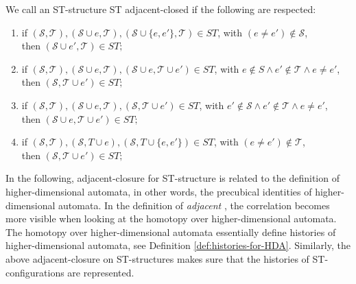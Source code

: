     \begin{definition}
        \label{def:ST adjacent-closure}
        We call an ST-structure ST adjacent-closed if the following are respected:
       
       \begin{enumerate}
           \item if $(\mathcal{S},\mathcal{T}), (\mathcal{S} \cup e, \mathcal{T}), (\mathcal{S} \cup \{e,e'\}, \mathcal{T}) \in ST$, with $(e \neq e') \notin \mathcal{S}$,\\
           then $(\mathcal{S} \cup e', \mathcal{T}) \in ST;$
           \item if $(\mathcal{S},\mathcal{T}), (\mathcal{S} \cup e, \mathcal{T}), (\mathcal{S} \cup e, \mathcal{T} \cup e') \in ST$, with $e \notin S \wedge e' \notin \mathcal{T} \wedge e \neq e'$, \\
           then $(\mathcal{S}, \mathcal{T} \cup e') \in ST;$
           \item if $(\mathcal{S},\mathcal{T}), (\mathcal{S} \cup e, \mathcal{T}), (\mathcal{S}, \mathcal{T} \cup e') \in ST$, with $e' \notin \mathcal{S} \wedge e' \notin \mathcal{T} \wedge e \neq e'$, \\
           then $(\mathcal{S} \cup e, \mathcal{T} \cup e') \in ST;$
           \item if $(\mathcal{S},\mathcal{T}), (\mathcal{S}, T \cup e), (\mathcal{S}, T \cup \{e,e'\}) \in ST$, with $(e \neq e') \notin \mathcal{T}$, \\
           then $(\mathcal{S}, \mathcal{T} \cup e') \in ST;$
       \end{enumerate}
    \end{definition}
    
    In the following, adjacent-closure for ST-structure is related to the definition of higher-dimensional automata, in other words, the precubical identities of higher-dimensional automata. In the definition of \emph{adjacent} \cite[Definition 19]{Glabbeek99invitedCONCUR}, the correlation becomes more visible when looking at the homotopy over higher-dimensional automata. The homotopy over higher-dimensional automata essentially define histories of higher-dimensional automata, see Definition \ref{def:histories-for-HDA}. Similarly, the above adjacent-closure on ST-structures makes sure that the histories of ST-configurations are represented.
    
